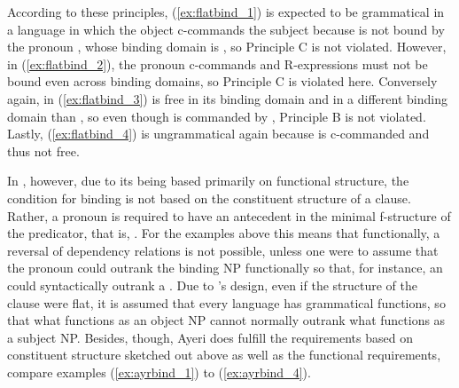 
According to these principles, (\ref{ex:flatbind_1}) is expected to be
grammatical in a language in which the object c-commands the subject because
 is not bound by the pronoun , whose binding domain is , so Principle C is not violated. However, in (\ref{ex:flatbind_2}), the
pronoun c-commands  and R-expressions must not be bound even across
binding domains, so Principle C is violated here. Conversely again,  in
(\ref{ex:flatbind_3}) is free in its binding domain and in a different binding
domain than , so even though  is commanded by
, Principle B is not violated. Lastly, (\ref{ex:flatbind_4}) is
ungrammatical again because  is c-commanded and thus not free.

In \Lfg{}, however, due to its being based primarily on functional structure,
the condition for binding is not based on the constituent structure of a
clause. Rather, a pronoun is required to have an antecedent in the minimal
f-structure of the predicator, that is, 
\parencites[230]{bresnan2016}[also compare][250]{bresnan2016}. For the examples
above this means that functionally, a reversal of dependency relations is not
possible, unless one were to assume that the pronoun could outrank the binding
NP functionally so that, for instance, an \Obj{} could syntactically outrank a
\Subj{}. Due to \Lfg{}'s design, even if the structure of the clause were flat,
it is assumed that every language has grammatical functions, so that what
functions as an object NP cannot normally outrank what functions as a subject
NP. Besides, though, Ayeri does fulfill the requirements based on constituent
structure sketched out above as well as the functional requirements, compare
examples (\ref{ex:ayrbind_1}) to (\ref{ex:ayrbind_4}).

